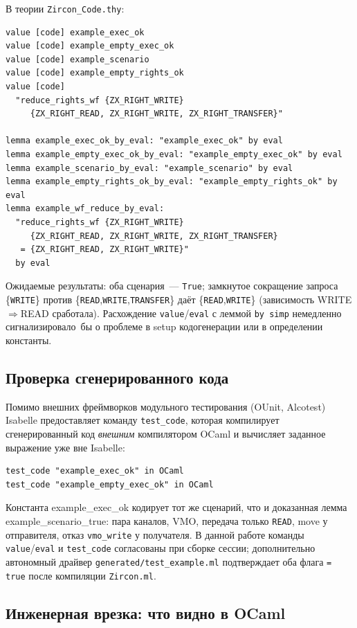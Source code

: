 \documentclass[11pt,a4paper]{article}
\newcommand{\isabel}[1]{{\isabelleit #1}}
\newcommand{\lemmaname}[1]{\isabel{#1}}
\begin{document}
В теории \texttt{Zircon\_Code.thy}:
\begin{lstlisting}
value [code] example_exec_ok
value [code] example_empty_exec_ok
value [code] example_scenario
value [code] example_empty_rights_ok
value [code]
  "reduce_rights_wf {ZX_RIGHT_WRITE}
     {ZX_RIGHT_READ, ZX_RIGHT_WRITE, ZX_RIGHT_TRANSFER}"

lemma example_exec_ok_by_eval: "example_exec_ok" by eval
lemma example_empty_exec_ok_by_eval: "example_empty_exec_ok" by eval
lemma example_scenario_by_eval: "example_scenario" by eval
lemma example_empty_rights_ok_by_eval: "example_empty_rights_ok" by eval
lemma example_wf_reduce_by_eval:
  "reduce_rights_wf {ZX_RIGHT_WRITE}
     {ZX_RIGHT_READ, ZX_RIGHT_WRITE, ZX_RIGHT_TRANSFER}
   = {ZX_RIGHT_READ, ZX_RIGHT_WRITE}"
  by eval
\end{lstlisting}
Ожидаемые результаты: оба сценария~--- \texttt{True}; замкнутое сокращение
запроса \{\texttt{WRITE}\} против \{\texttt{READ},\texttt{WRITE},\texttt{TRANSFER}\}
даёт \{\texttt{READ},\texttt{WRITE}\} (зависимость WRITE$\Rightarrow$READ
сработала). Расхождение \texttt{value}/\texttt{eval} с леммой
\texttt{by~simp} немедленно сигнализировало~бы о проблеме в setup
кодогенерации или в определении константы.

\subsection{Проверка сгенерированного кода}

Помимо внешних фреймворков модульного тестирования (OUnit, Alcotest)
Isabelle предоставляет команду \texttt{test\_code}, которая
компилирует сгенерированный код \emph{внешним} компилятором OCaml и
вычисляет заданное выражение уже вне Isabelle:
\begin{lstlisting}
test_code "example_exec_ok" in OCaml
test_code "example_empty_exec_ok" in OCaml
\end{lstlisting}
Константа \lemmaname{example\_exec\_ok} кодирует тот же сценарий, что и
доказанная лемма \lemmaname{example\_scenario\_true}: пара каналов, VMO,
передача только \texttt{READ}, move у отправителя, отказ
\texttt{vmo\_write} у получателя.
В данной работе команды \texttt{value}/\texttt{eval} и \texttt{test\_code}
согласованы при сборке сессии; дополнительно автономный драйвер
\texttt{generated/test\_example.ml} подтверждает оба флага
\texttt{= true} после компиляции \texttt{Zircon.ml}.

\subsection{Инженерная врезка: что видно в OCaml}
\end{document}
